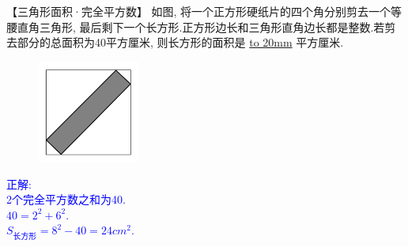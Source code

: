 \item {
    【三角形面积·完全平方数】
    如图, 将一个正方形硬纸片的四个角分别剪去一个等腰直角三角形, 最后剩下一个长方形.正方形边长和三角形直角边长都是整数.若剪去部分的总面积为40平方厘米, 则长方形的面积是 \underline{\hbox to 20mm{}} 平方厘米.
    \begin{figure}[H] 
        \centering
        \includegraphics[width=0.3\textwidth]{./pics/Chapter_2/12.png}
    \end{figure}
    \ifshowSolution 
        \fangsong{}\textcolor{blue}{
            正解: \\
            2个完全平方数之和为40.\\
            $40 = 2^2 + 6^2$.\\
            $S_{长方形} = 8^2 - 40 = 24 {cm}^2$.
        }
    \else
        \vspace{1cm}
    \fi
}

